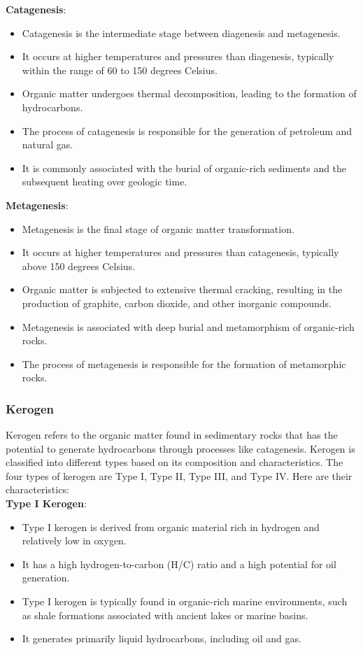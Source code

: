 \documentclass{article}
\begin{document}
\textbf{Catagenesis}:
    \begin{itemize}
        \item Catagenesis is the intermediate stage between diagenesis and metagenesis.
        \item It occurs at higher temperatures and pressures than diagenesis, typically within the range of 60 to 150 degrees Celsius.
        \item Organic matter undergoes thermal decomposition, leading to the formation of hydrocarbons.
        \item The process of catagenesis is responsible for the generation of petroleum and natural gas.
        \item It is commonly associated with the burial of organic-rich sediments and the subsequent heating over geologic time.
    \end{itemize}

\textbf{Metagenesis}:
    \begin{itemize}
        \item Metagenesis is the final stage of organic matter transformation.
        \item It occurs at higher temperatures and pressures than catagenesis, typically above 150 degrees Celsius.
        \item Organic matter is subjected to extensive thermal cracking, resulting in the production of graphite, carbon dioxide, and other inorganic compounds.
        \item Metagenesis is associated with deep burial and metamorphism of organic-rich rocks.
        \item The process of metagenesis is responsible for the formation of metamorphic rocks.
    \end{itemize}


\subsubsection*{Kerogen}
Kerogen refers to the organic matter found in sedimentary rocks that has the potential to generate hydrocarbons through processes like catagenesis. Kerogen is classified into different types based on its composition and characteristics. The four types of kerogen are Type I, Type II, Type III, and Type IV. Here are their characteristics:\\

\textbf{Type I Kerogen}:
    \begin{itemize}
        \item Type I kerogen is derived from organic material rich in hydrogen and relatively low in oxygen.
        \item It has a high hydrogen-to-carbon (H/C) ratio and a high potential for oil generation.
        \item Type I kerogen is typically found in organic-rich marine environments, such as shale formations associated with ancient lakes or marine basins.
        \item It generates primarily liquid hydrocarbons, including oil and gas.
    \end{itemize}
\end{document}
